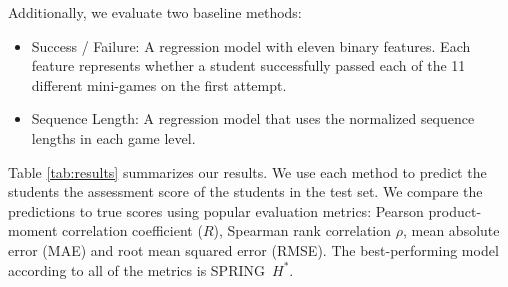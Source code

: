 \documentclass{sigchi}
\def\algname{SPRING\xspace}
\begin{document}
	Additionally, we evaluate two baseline methods:
	\begin{itemize}
		\item Success / Failure: A regression model with eleven binary features. Each feature represents whether a student  successfully passed each of the 11 different mini-games on the first attempt.
		\item Sequence Length: A regression model that uses the normalized sequence lengths in each game level. 
	\end{itemize}
	
	Table \ref{tab:results} summarizes our results.
	We use each method to predict the students the assessment score of the students in the test set.
	We compare the predictions to true scores using popular evaluation metrics:
	Pearson product-moment correlation coefficient ($R$), Spearman rank correlation $\rho$, mean absolute error (MAE) and root mean squared error (RMSE). 
	The best-performing model according to all of the metrics is \algname~$H^*$. 
		
\end{document}
